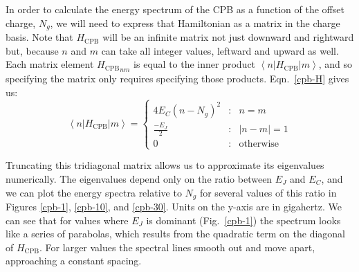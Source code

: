 \documentclass[twocolumn]{revtex4}
\newcommand{\innerp}[3]{\left< #1 | #2 | #3 \right>}
\begin{document}
In order to calculate the energy spectrum of the CPB as a function of
the offset charge, $N_g$, we will need to express that Hamiltonian as
a matrix in the charge basis. Note that $H_{\text{CPB}}$ will be an
infinite matrix not just downward and rightward but, because $n$ and
$m$ can take all integer values, leftward and upward as well. Each
matrix element ${H_{\text{CPB}}}_{nm}$ is equal to the inner product
$\innerp{n}{H_{\text{CPB}}}{m}$, and so specifying the matrix only
requires specifying those products. Eqn.~\ref{cpb-H} gives us:
\begin{equation}
  \innerp{n}{H_{\text{CPB}}}{m} = \left\{\begin{array}{lcl}
        4E_C(n-N_g)^2 & : &n=m \\
        \frac{-E_J}{2} & : &|n-m|=1\\
        0 & : & \text{otherwise}
        \end{array}\right.
\end{equation}

Truncating this tridiagonal matrix allows us to approximate its
eigenvalues numerically. The eigenvalues depend only on the ratio
between $E_J$ and $E_C$, and we can plot the energy spectra relative
to $N_g$ for several values of this ratio in Figures \ref{cpb-1},
\ref{cpb-10}, and \ref{cpb-30}. Units on the y-axis are in
gigahertz. We can see that for values where $E_J$ is dominant
(Fig.~\ref{cpb-1}) the spectrum looks like a series of parabolas,
which results from the quadratic term on the diagonal of
$H_{\text{CPB}}$. For larger values the spectral lines smooth out and
move apart, approaching a constant spacing.
\end{document}
